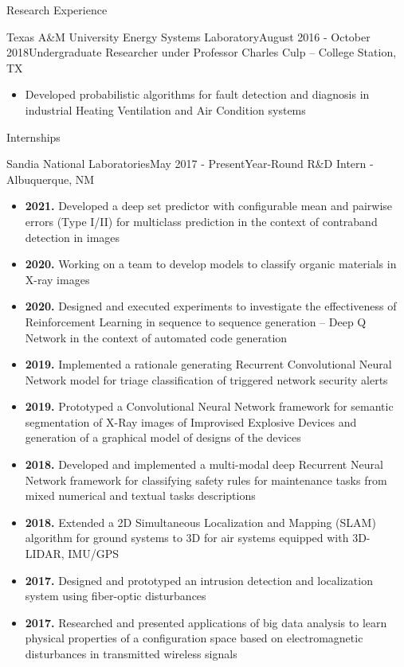 \documentclass{resume} %
\begin{document}
\begin{rSection}{Research Experience}
\begin{rSubsection}{Texas A\&M University Energy Systems Laboratory}{August 2016 - October 2018}{Undergraduate Researcher under Professor Charles Culp -- College Station, TX}
\begin{itemize}
    \item Developed probabilistic algorithms for fault detection and diagnosis in industrial Heating Ventilation and Air Condition systems
\end{itemize}
\end{rSubsection}
\end{rSection}

\begin{rSection}{Internships}
\begin{rSubsection}{Sandia National Laboratories}{May 2017 - Present}{Year-Round R\&D Intern - Albuquerque, NM}

\begin{itemize}
    \item \textbf{2021.} Developed a deep set predictor with configurable mean and pairwise errors (Type I/II) for multiclass prediction in the context of contraband detection in images
    \item \textbf{2020.} Working on a team to develop models to classify organic materials in X-ray images
    \item \textbf{2020.} Designed and executed experiments to investigate the effectiveness of Reinforcement Learning in sequence to sequence generation -- Deep Q Network in the context of automated code generation
    \item \textbf{2019.} Implemented a rationale generating Recurrent Convolutional Neural Network model for triage classification of triggered network security alerts
    \item \textbf{2019.} Prototyped a Convolutional Neural Network framework for semantic segmentation of X-Ray images of Improvised Explosive Devices and generation of a graphical model of designs of the devices
    \item \textbf{2018.} Developed and implemented a multi-modal deep Recurrent Neural Network framework for classifying safety rules for maintenance tasks from mixed numerical and textual tasks descriptions
    \item \textbf{2018.} Extended a 2D Simultaneous Localization and Mapping (SLAM) algorithm for ground systems to 3D for air systems equipped with 3D-LIDAR, IMU/GPS
    \item \textbf{2017.} Designed and prototyped an intrusion detection and localization system using fiber-optic disturbances 
    \item \textbf{2017.} Researched and presented applications of big data analysis to learn physical properties of a configuration space based on electromagnetic disturbances in transmitted wireless signals
\end{itemize}

\end{rSubsection}
\end{rSection}
\end{document}
